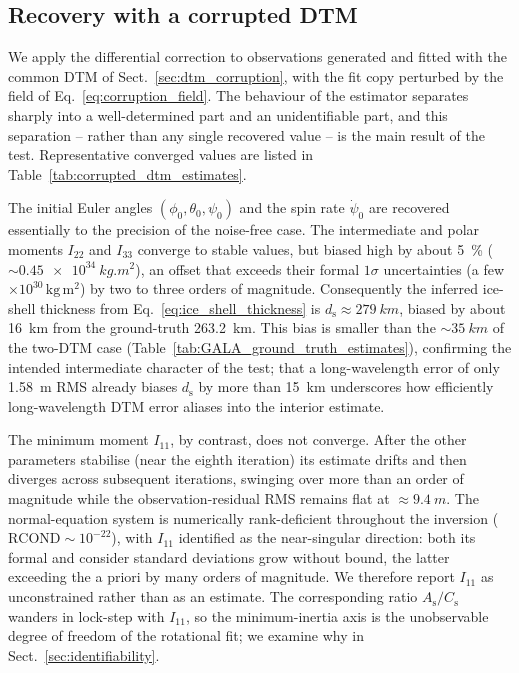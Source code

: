 \documentclass[lineno, pdflatex,sn-mathphys-ay]{sn-jnl}
\theoremstyle{thmstyleone}%
\theoremstyle{thmstyletwo}%
\theoremstyle{thmstylethree}%
\begin{document}
\subsection{Recovery with a corrupted DTM}\label{sec:results_corrupted_dtm}

We apply the differential correction to observations generated and fitted with the common DTM of Sect.~\ref{sec:dtm_corruption}, with the fit copy perturbed by the field of Eq.~\eqref{eq:corruption_field}. The behaviour of the estimator separates sharply into a well-determined part and an unidentifiable part, and this separation -- rather than any single recovered value -- is the main result of the test. Representative converged values are listed in Table~\ref{tab:corrupted_dtm_estimates}.

The initial Euler angles $(\phi_0,\theta_0,\psi_0)$ and the spin rate $\dot\psi_0$ are recovered essentially to the precision of the noise-free case. The intermediate and polar moments $I_{22}$ and $I_{33}$ converge to stable values, but biased high by about \SI{5}{\percent} ($\sim\!\SI{0.45e34}{kg.m^2}$), an offset that exceeds their formal $1\sigma$ uncertainties (a few $\times 10^{30}\,\mathrm{kg\,m^2}$) by two to three orders of magnitude. Consequently the inferred ice-shell thickness from Eq.~\eqref{eq:ice_shell_thickness} is ${d_{\mathrm{s}} \approx \SI{279}{km}}$, %
biased by about \SI{16}{km} from the ground-truth \SI{263.2}{km}. This bias is smaller than the $\sim\!\SI{35}{km}$ of the two-DTM case (Table~\ref{tab:GALA_ground_truth_estimates}), confirming the intended intermediate character of the test; that a long-wavelength error of only \SI{1.58}{m} RMS already biases $d_{\mathrm{s}}$ by more than \SI{15}{km} underscores how efficiently long-wavelength DTM error aliases into the interior estimate.

The minimum moment $I_{11}$, by contrast, does not converge. After the other parameters stabilise (near the eighth iteration) its estimate drifts and then diverges across subsequent iterations, swinging over more than an order of magnitude while the observation-residual RMS remains flat at $\approx\!\SI{9.4}{m}$. The normal-equation system is numerically rank-deficient throughout the inversion ($\mathrm{RCOND}\sim 10^{-22}$), with $I_{11}$ identified as the near-singular direction: both its formal and consider standard deviations grow without bound, the latter exceeding the a priori by many orders of magnitude. We therefore report $I_{11}$ as unconstrained rather than as an estimate. The corresponding ratio $A_{\mathrm{s}}/C_{\mathrm{s}}$ wanders in lock-step with $I_{11}$, so the minimum-inertia axis is the unobservable degree of freedom of the rotational fit; we examine why in Sect.~\ref{sec:identifiability}.
\end{document}
